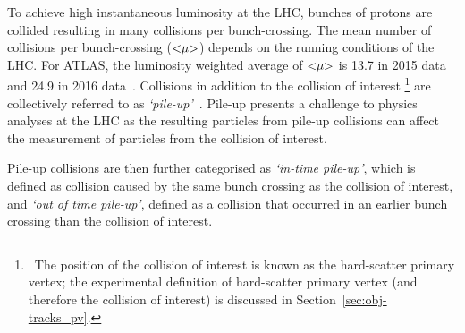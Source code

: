 
To achieve high instantaneous luminosity at the LHC, bunches of protons are collided resulting in many collisions per bunch-crossing.
The mean number of collisions per bunch-crossing ($<\hspace{-3pt}\mu\hspace{-3pt}>$) depends on the running conditions of the LHC.
For ATLAS, the luminosity weighted average of $<\hspace{-3pt}\mu\hspace{-3pt}>$ is 13.7 in 2015 data and 24.9 in 2016 data~\cite{det-ATLAS_lumi_twiki}.
Collisions in addition to the collision of interest
\footnote{\ The position of the collision of interest is known as the hard-scatter primary vertex;
  the experimental definition of hard-scatter primary vertex (and therefore the collision of interest) is discussed in Section~\ref{sec:obj-tracks_pv}.}
are collectively referred to as \textit{`pile-up'}~\cite{det-pileup}.
Pile-up presents a challenge to physics analyses at the LHC
as the resulting particles from pile-up collisions can affect the measurement of particles from the collision of interest.

Pile-up collisions are then further categorised as \textit{`in-time pile-up'},
which is defined as collision caused by the same bunch crossing as the collision of interest,
and \textit{`out of time pile-up'},
defined as a collision that occurred in an earlier bunch crossing than the collision of interest.

